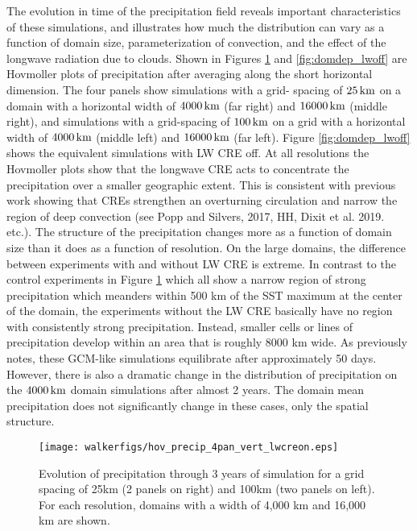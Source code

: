 \documentclass[draft]{agujournal2019}
\begin{document}
The evolution in time of the precipitation field reveals important characteristics of these simulations, and 
illustrates how much the distribution can vary as a function of domain size, parameterization of convection, 
and the effect of the longwave radiation due to clouds. 
Shown in Figures {\ref{fig:domdep}} and {\ref{fig:domdep_lwoff}} are Hovmoller plots of precipitation after 
averaging along the short horizontal dimension.  The four panels show simulations with a grid-
spacing of $25\, \rm{km}$ on a domain with a horizontal width of $4000\, \rm{km}$ (far right) and $16000\, \rm{km}$ 
(middle right), and 
simulations with a grid-spacing of $100\, \rm{km}$ on a grid with a horizontal width of $4000\, \rm{km}$ (middle left) and 
$16000\, \rm{km}$ (far left).  Figure  {\ref{fig:domdep_lwoff}} shows the equivalent simulations with LW CRE off.    
 At all resolutions the Hovmoller plots show that the longwave CRE acts to concentrate the 
precipitation over a smaller geographic extent.   This is consistent with previous work showing that CREs 
strengthen an overturning circulation and
narrow the region of deep convection (see Popp and Silvers, 2017, HH, Dixit et al. 2019.  etc.).
The structure of the precipitation changes more as a function of domain size than it does as a function of resolution. 
On the large domains, the difference between experiments with and without LW CRE is extreme.  In contrast to the control 
experiments in Figure {\ref{fig:domdep}} which all show a narrow region of strong precipitation which meanders within 
500 km of the SST maximum at the center of the domain,  
the experiments without the LW CRE basically have no region with consistently strong precipitation.  Instead, 
smaller cells or lines of precipitation develop within an area that is roughly 8000 km wide.  As previously notes, these
GCM-like simulations equilibrate after approximately 50 days.  However, there is also a dramatic change in 
the distribution of precipitation on the $4000\, \rm{km}$ domain simulations after almost 2 years.   The domain mean 
precipitation does not significantly change in these cases, only the spatial structure.  

\begin{figure}
  \texttt{[image: walkerfigs/hov\_precip\_4pan\_vert\_lwcreon.eps]}
  \caption{Evolution of precipitation through 3 years of simulation for a grid spacing of 25km (2 panels on right) and
  100km (two panels on left).  For each resolution, domains with a width of 4,000 km and 16,000 km are shown.}
  \label{fig:domdep}
\end{figure}
\end{document}
